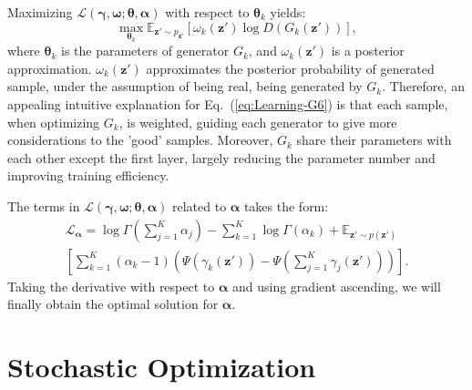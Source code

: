 \documentclass{article}
\begin{document}
Maximizing $\mathcal{L}\left( \bm{\gamma},\bm{\omega};\bm{\theta},\bm{\alpha} \right)$ with respect to $\bm{\theta}_k$ yields:
\begin{equation}
\max_{\bm{\theta}_k}
\mathbb{E}_{\mathbf{z}' \sim p_{\mathbf{z}'}}
\left[
\omega_k\left( \mathbf{z}' \right)
\log D\left( G_k\left( \mathbf{z}' \right) \right)
\right],
\label{eq:Learning-G6}
\end{equation}
where $\bm{\theta}_k$ is the parameters of generator $G_k$, and $\omega_k\left( \mathbf{z}' \right)$ is a posterior approximation.
$\omega_k\left( \mathbf{z}' \right)$ approximates the posterior probability of generated sample, under the assumption of being real, being generated by $G_k$.
Therefore, an appealing intuitive explanation for Eq.~(\ref{eq:Learning-G6}) is that each sample, when optimizing $G_k$, is weighted, guiding each generator to give more considerations to the 'good' samples.
Moreover, $G_k$ share their parameters with each other except the first layer, largely reducing the parameter number and improving training efficiency.

The terms in $\mathcal{L}\left( \bm{\gamma},\bm{\omega};\bm{\theta},\bm{\alpha} \right)$ related to $\bm{\alpha}$ takes the form:
\begin{multline}
\mathcal{L}_{\bm{\alpha}}
=
\log \Gamma \left( \sum\nolimits_{j=1}^K \alpha_j \right)
-\sum_{k=1}^K \log \Gamma \left( \alpha_k \right)
+
\mathbb{E}_{\mathbf{z}' \sim p\left(\mathbf{z}'\right)}
\\
\left[
\sum_{k=1}^K
\left( \alpha_k-1 \right)
\left( \Psi\left(\gamma_k\left(\mathbf{z}'\right)\right)
-\Psi\left(\sum\nolimits_{j=1}^K\gamma_j\left(\mathbf{z}'\right)\right) \right)
\right].
\label{eq:Learning-G7}
\end{multline}
Taking the derivative with respect to $\bm{\alpha}$ and using gradient ascending, we will finally obtain the optimal solution for $\bm{\alpha}$.


\section{Stochastic Optimization}
\label{Stoch}
\end{document}
